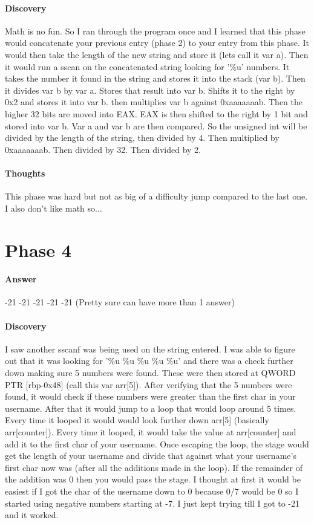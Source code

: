 \documentclass[12pt]{article}
\begin{document}
\paragraph{Discovery}
Math is no fun. So I ran through the program once and I learned that this phase would concatenate your previous entry (phase 2) to your entry from this phase. It would then take the length of the new string and store it (lets call it var a). Then it would run a sscan on the concatenated string looking for '\%u' numbers. It takes the number it found in the string and stores it into the stack (var b). Then it divides var b by var a. Stores that result into var b. Shifts it to the right by 0x2 and stores it into var b. then multiplies var b against 0xaaaaaaab. Then the higher 32 bits are moved into EAX. EAX is then shifted to the right by 1 bit and stored into var b. 
Var a and var b are then compared. 
So the unsigned int will be divided by the length of the string, then divided by 4. Then multiplied by 0xaaaaaaab. Then divided by 32. Then divided by 2.

\paragraph{Thoughts}
This phase was hard but not as big of a difficulty jump compared to the last one. I also don't like math so...

\section{Phase 4}
\paragraph{Answer}
-21 -21 -21 -21 -21 (Pretty sure can have more than 1 answer)

\paragraph{Discovery}
I saw another sscanf was being used on the string entered. I was able to figure out that it was looking for '\%u \%u \%u \%u \%u' and there was a check further down making sure 5 numbers were found. These were then stored at QWORD PTR [rbp-0x48] (call this var arr[5]). After verifying that the 5 numbers were found, it would check if these numbers were greater than the first char in your username. After that it would jump to a loop that would loop around 5 times. Every time it looped it would would look further down arr[5] (basically arr[counter]). Every time it looped, it would take the value at arr[counter] and add it to the first char of your username. Once escaping the loop, the stage would get the length of your username and divide that against what your username's first char now was (after all the additions made in the loop). If the remainder of the addition was 0 then you would pass the stage. 
I thought at first it would be easiest if I got the char of the username down to 0 because 0/7 would be 0 so I started using negative numbers starting at -7. I just kept trying till I got to -21 and it worked. 
\end{document}
